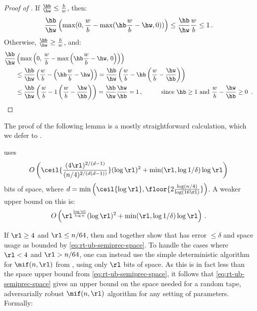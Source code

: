 \begin{itemize}
\begin{itemize}
\begin{proof}[Proof of ]
  If $\frac{\hb}{\hw} \le \frac{b}{w}$, then:
  \begin{align*}
    \frac{\hb}{\hw} \left( \max(0, \frac{w}{b} - \max(\hb \frac{w}{b} - \hw, 0) )\right) \le \frac{\hb}{\hw} \frac{w}{b} \le 1 \,.
  \end{align*}
  Otherwise, $\frac{\hb}{\hw} \ge \frac{b}{w}$, and:
  \begin{align*}
    \frac{\hb}{\hw} &\left( \max\left(0,\, \frac{w}{b} - \max\left(\hb \frac{w}{b} - \hw,\, 0\right) \right)\right) \\
      &\le \frac{\hb}{\hw} \left(\frac{w}{b} - \left(\hb \frac{w}{b} - \hw\right)\right) 
      = \frac{\hb}{\hw} \left(\frac{w}{b} - \hb \left(\frac{w}{b} - \frac{\hw}{\hb}\right)\right)\\
      &\le \frac{\hb}{\hw} \left(\frac{w}{b} - 1 \left(\frac{w}{b} - \frac{\hw}{\hb}\right)\right) = \frac{\hb}{\hw} \frac{\hw}{\hb} = 1 \,, \qquad\quad \text{since $\hb \ge 1$ and $\frac{w}{b} - \frac{\hw}{\hb} \ge 0$ \,.} \qedhere
  \end{align*}
\end{proof}


The proof of the following lemma is a mostly straightforward calculation, which we defer to .

\begin{lemma}\label{lem:rt-ub-space-usage}
   uses 
  \begin{align}
    O\left(\ceil{\frac{(4 \rl)^{2/(d-1)}}{(n/4)^{2/(d(d-1))}}} (\log \rl)^2 + \min(\rl, \log 1/\delta) \log \rl \right) \label{eq:rt-ub-semiprec-space}
  \end{align} bits of space, where $d = \min\left(\ceil{\log \rl}, \floor{2 \frac{\log(n/4)}{\log(16\rl)}}\right)$. A weaker upper bound on this is:
  \begin{align*}
    O\left(\rl^{\frac{\log \rl}{\log n}} (\log \rl)^2 + \min(\rl, \log 1/\delta) \log \rl\right) \,.
  \end{align*}
\end{lemma}


If $\rl \ge 4$ and $\rl \le n/64$, then  and  together show that  has error $\le \delta$ and space
usage as bounded by \cref{eq:rt-ub-semiprec-space}. To handle the cases where
$\rl < 4$ and $\rl > n/64$, one can instead use the simple deterministic algorithm
for $\mif(n,\rl)$ from \cite{Stoeckl23}, using only $\rl$ bits of space. As this is in
fact less than the space upper bound from \cref{eq:rt-ub-semiprec-space}, it follows
that \cref{eq:rt-ub-semiprec-space} gives an upper bound on the space
needed for a random tape, adversarially robust $\mif(n,\rl)$ algorithm for any
setting of parameters. Formally:


\end{itemize}
\end{itemize}
